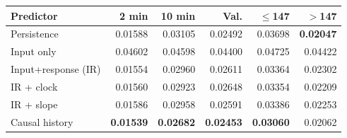 \begin{tabular}{lrrrrr}
\toprule
Predictor & 2 min & 10 min & Val. & $\le$147 & $>$147 \\
\midrule
Persistence & 0.01588 & 0.03105 & 0.02492 & 0.03698 & \textbf{0.02047} \\
Input only & 0.04602 & 0.04598 & 0.04400 & 0.04725 & 0.04422 \\
Input+response (IR) & 0.01554 & 0.02960 & 0.02611 & 0.03364 & 0.02302 \\
IR + clock & 0.01560 & 0.02923 & 0.02648 & 0.03354 & 0.02209 \\
IR + slope & 0.01586 & 0.02958 & 0.02591 & 0.03386 & 0.02253 \\
Causal history & \textbf{0.01539} & \textbf{0.02682} & \textbf{0.02453} & \textbf{0.03060} & 0.02062 \\
\bottomrule
\end{tabular}

